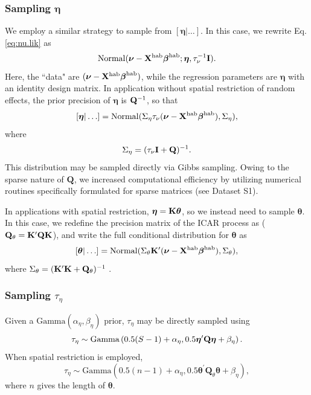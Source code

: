 \documentclass[10pt]{article}
\newcommand{\bQ}{\ensuremath{\mathbf{Q}}}
\begin{document}
\subsubsection*{Sampling $\boldsymbol{\eta}$}

We employ a similar strategy to sample from  $[\boldsymbol{\eta}|\hdots]$.  In this case, we
rewrite Eq. \ref{eq:nu.lik} as
$$
{\rm Normal}(\boldsymbol{\nu}-{\bf X}^{\rm hab}\boldsymbol{\beta}^{\rm hab};\boldsymbol{\eta} ,\tau_\nu^{-1}{\bf I}).
$$
Here, the ``data" are $(\boldsymbol{\nu}-{\bf X}^{\rm hab}\boldsymbol{\beta}^{\rm hab})$, while the regression parameters are $\boldsymbol{\eta}$ with an identity design matrix. In application without spatial restriction of random effects, the prior precision of $\boldsymbol{\eta}$ is ${\bf Q}^{-1}$, so that
$$
[\boldsymbol{\eta}|\hdots] = {\rm Normal}(\Sigma_\eta \tau_\nu (\boldsymbol{\nu}-{\bf X}^{\rm hab}\boldsymbol{\beta}^{\rm hab}),\Sigma_\eta),
$$
where
$$
\Sigma_\eta=(\tau_\nu{\bf I} + {\bf Q})^{-1}.
$$
This distribution may be sampled directly via Gibbs sampling. Owing to the sparse nature of $\bQ$, we increased computational efficiency by utilizing numerical routines specifically formulated for sparse matrices (see Dataset S1).

In applications with spatial restriction, $\boldsymbol{\eta} = {\bf K}\boldsymbol{\theta}$, so we instead need to sample $\boldsymbol{\theta}$.  In this case, we redefine the precision matrix of the ICAR process as ($\bQ_\theta={\bf K}^\prime \bQ {\bf K}$), and write the full conditional distribution for $\boldsymbol{\theta}$ as
$$
[\boldsymbol{\theta}|\hdots] = {\rm Normal}(\Sigma_\theta {\bf K}^\prime (\boldsymbol{\nu}-{\bf X}^{\rm hab}\boldsymbol{\beta}^{\rm hab}),\Sigma_\theta),
$$
where $\Sigma_\theta=({\bf K}^\prime {\bf K} + {\bf Q_\theta})^{-1}$ \cite{HughesHaran2012,JohnsonEtAl2012}.

 

\subsubsection*{Sampling $\tau_\eta$}
Given a $\textrm{Gamma}(\alpha_\eta,\beta_\eta)$ prior, $\tau_\eta$ may be directly sampled using
$$
\tau_\eta \sim \textrm{Gamma}\left( 0.5(S-1)+\alpha_\eta,0.5\boldsymbol{\eta}^\prime {\bf Q} \boldsymbol{\eta}+\beta_\eta \right).
$$
When spatial restriction is employed, 
$$
\tau_\eta \sim \textrm{Gamma}\left( 0.5(n-1)+\alpha_\eta,0.5\boldsymbol{\theta}^\prime \bQ_\theta \boldsymbol{\theta} +\beta_\eta \right),
$$
where $n$ gives the length of $\boldsymbol{\theta}$.
\end{document}
